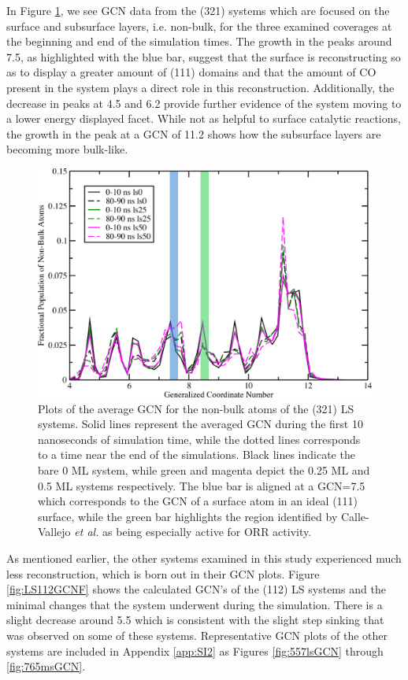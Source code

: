 In Figure \ref{fig:LS321GCNF}, we see GCN data from the  (321) systems
which are focused on the surface and subsurface layers, i.e. non-bulk, for the
three examined coverages at  the beginning and end of the simulation times. The
growth in the peaks around 7.5, as highlighted with the blue bar, suggest that
the surface is reconstructing so as to display a greater amount of (111)
domains and that the amount of CO present in the system plays a direct role in
this reconstruction. Additionally, the decrease in peaks at 4.5 and 6.2 provide
further evidence of the system moving to a lower energy displayed facet. While
not as helpful to surface catalytic reactions, the growth in the peak at a GCN
of 11.2 shows how the subsurface layers are becoming more bulk-like.

\begin{figure}[p!]
  \includegraphics[width=\linewidth]{../figures/chap4/321ls_GCNF.pdf}
  \caption{Plots of the average GCN for the non-bulk atoms of the  (321)
LS systems.  Solid lines represent the averaged GCN during the first 10
nanoseconds of simulation time, while the dotted lines corresponds to a time near
the end of the simulations. Black lines indicate the bare 0 ML system, while
green and magenta depict the 0.25 ML and 0.5 ML systems respectively. The blue
bar is aligned at a GCN=7.5 which corresponds to the GCN of a surface atom in
an ideal  (111) surface, while the green bar highlights the region
identified by Calle-Vallejo {\em et al.} as being especially active for ORR
activity.\citep{Calle-Vallejo:2015qq}}
\label{fig:LS321GCNF}
\end{figure}

As mentioned earlier, the other systems examined in this study experienced much
less reconstruction, which is born out in their GCN plots. Figure
\ref{fig:LS112GCNF} shows the calculated GCN's of the  (112) LS
systems and the minimal changes that the system underwent during the
simulation. There is a slight decrease around 5.5 which is consistent with the
slight step sinking that was observed on some of these systems. Representative GCN plots
of the other systems are included in Appendix \ref{app:SI2} as Figures \ref{fig:557lsGCN} through \ref{fig:765msGCN}.

